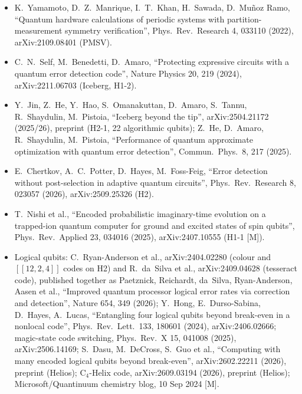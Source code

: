 \documentclass[11pt,a4paper]{article}
\newcommand{\lM}{\textcolor{alertred}{[M]}}  %
\begin{document}
\begin{itemize}
\item K.~Yamamoto, D.~Z.~Manrique, I.~T.~Khan, H.~Sawada, D.~Mu\~noz Ramo, ``Quantum hardware calculations of periodic systems with partition-measurement symmetry verification'', Phys.\ Rev.\ Research 4, 033110 (2022), arXiv:2109.08401 (PMSV).
\item C.~N.~Self, M.~Benedetti, D.~Amaro, ``Protecting expressive circuits with a quantum error detection code'', Nature Physics 20, 219 (2024), arXiv:2211.06703 (Iceberg, H1-2).
\item Y.~Jin, Z.~He, Y.~Hao, S.~Omanakuttan, D.~Amaro, S.~Tannu, R.~Shaydulin, M.~Pistoia, ``Iceberg beyond the tip'', arXiv:2504.21172 (2025/26), preprint (H2-1, 22 algorithmic qubits); Z.~He, D.~Amaro, R.~Shaydulin, M.~Pistoia, ``Performance of quantum approximate optimization with quantum error detection'', Commun.\ Phys.\ 8, 217 (2025).
\item E.~Chertkov, A.~C.~Potter, D.~Hayes, M.~Foss-Feig, ``Error detection without post-selection in adaptive quantum circuits'', Phys.\ Rev.\ Research 8, 023057 (2026), arXiv:2509.25326 (H2).
\item T.~Nishi et al., ``Encoded probabilistic imaginary-time evolution on a trapped-ion quantum computer for ground and excited states of spin qubits'', Phys.\ Rev.\ Applied 23, 034016 (2025), arXiv:2407.10555 (H1-1 \lM).
\item Logical qubits: C.~Ryan-Anderson et al., arXiv:2404.02280 (colour and $[[12,2,4]]$ codes on H2) and R.~da~Silva et al., arXiv:2409.04628 (tesseract code), published together as Paetznick, Reichardt, da~Silva, Ryan-Anderson, Aasen et al., ``Improved quantum processor logical error rates via correction and detection'', Nature 654, 349 (2026); Y.~Hong, E.~Durso-Sabina, D.~Hayes, A.~Lucas, ``Entangling four logical qubits beyond break-even in a nonlocal code'', Phys.\ Rev.\ Lett.\ 133, 180601 (2024), arXiv:2406.02666; magic-state code switching, Phys.\ Rev.\ X 15, 041008 (2025), arXiv:2506.14169; S.~Dasu, M.~DeCross, S.~Guo et al., ``Computing with many encoded logical qubits beyond break-even'', arXiv:2602.22211 (2026), preprint (Helios); C$_4$-Helix code, arXiv:2609.03194 (2026), preprint (Helios); Microsoft/Quantinuum chemistry blog, 10 Sep 2024 \lM.
\end{itemize}
\end{document}

